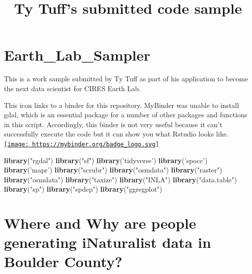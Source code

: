 \documentclass[
]{article}
\title{Ty Tuff's submitted code sample}
\author{}
\date{\vspace{-2.5em}}
\newenvironment{Shaded}{\begin{snugshade}}{\end{snugshade}}
\newcommand{\KeywordTok}[1]{\textcolor[rgb]{0.13,0.29,0.53}{\textbf{#1}}}
\newcommand{\NormalTok}[1]{#1}
\newcommand{\StringTok}[1]{\textcolor[rgb]{0.31,0.60,0.02}{#1}}
\begin{document}
\maketitle

\hypertarget{earth_lab_sampler}{%
\section{Earth\_Lab\_Sampler}\label{earth_lab_sampler}}

This is a work sample submitted by Ty Tuff as part of his application to
become the next data scientist for CIRES Earth Lab.

This icon links to a binder for this repository. MyBinder was unable to
install gdal, which is an essential package for a number of other
packages and functions in this script. Accordingly, this binder is not
very useful because it can't successfully execute the code but it can
show you what Rstudio looks like.
\href{http://mybinder.org/v2/gh/ttuff/Earth_Lab_Sampler/main?urlpath=rstudio}{\texttt{[image: https://mybinder.org/badge\_logo.svg]}}

\begin{Shaded}
\begin{Highlighting}[]
\KeywordTok{library}\NormalTok{(}\StringTok{"rgdal"}\NormalTok{) }
\KeywordTok{library}\NormalTok{(}\StringTok{"sf"}\NormalTok{)}
\KeywordTok{library}\NormalTok{(}\StringTok{'tidyverse'}\NormalTok{)}
\KeywordTok{library}\NormalTok{(}\StringTok{'spocc'}\NormalTok{)}
\KeywordTok{library}\NormalTok{(}\StringTok{'mapr'}\NormalTok{)}
\KeywordTok{library}\NormalTok{(}\StringTok{"scrubr"}\NormalTok{)}
\KeywordTok{library}\NormalTok{(}\StringTok{"osmdata"}\NormalTok{)}
\KeywordTok{library}\NormalTok{(}\StringTok{"raster"}\NormalTok{)}
\KeywordTok{library}\NormalTok{(}\StringTok{"osmdata"}\NormalTok{)}
\KeywordTok{library}\NormalTok{(}\StringTok{"taxize"}\NormalTok{)}
\KeywordTok{library}\NormalTok{(}\StringTok{"INLA"}\NormalTok{)}
\KeywordTok{library}\NormalTok{(}\StringTok{"data.table"}\NormalTok{)}
\KeywordTok{library}\NormalTok{(}\StringTok{"sp"}\NormalTok{)}
\KeywordTok{library}\NormalTok{(}\StringTok{"spdep"}\NormalTok{)}
\KeywordTok{library}\NormalTok{(}\StringTok{"ggregplot"}\NormalTok{)}
\end{Highlighting}
\end{Shaded}

\hypertarget{where-and-why-are-people-generating-inaturalist-data-in-boulder-county}{%
\section{Where and Why are people generating iNaturalist data in Boulder
County?}\label{where-and-why-are-people-generating-inaturalist-data-in-boulder-county}}
\end{document}
